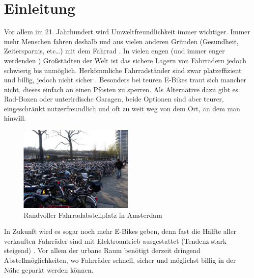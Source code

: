\section{Einleitung}
Vor allem im 21. Jahrhundert wird Umweltfreundlichkeit immer wichtiger. Immer mehr Menschen fahren deshalb und aus vielen anderen Gründen (Gesundheit, Zeitersparnis, etc…) mit dem Fahrrad . In vielen engen (und immer enger werdenden ) Großstädten der Welt ist das sichere Lagern von Fahrrädern jedoch schwierig bis unmöglich. Herkömmliche Fahrradständer sind zwar platzeffizient und billig, jedoch nicht sicher . Besonders bei teuren E-Bikes traut sich mancher nicht, dieses einfach an einen Pfosten zu sperren. Als Alternative dazu gibt es Rad-Boxen oder unterirdische Garagen, beide Optionen sind aber teurer, eingeschränkt nutzerfreundlich und oft zu weit weg von dem Ort, an dem man hinwill.

\begin{figure}[H]
    \centering
    \includegraphics[width=0.5\textwidth]{images/fahrrad_parkhaus_voll}
    \caption{Randvoller Fahrradabstellplatz in Amsterdam }
    \label{fig:fahrrad_parkhaus_voll}
\end{figure}

In Zukunft wird es sogar noch mehr E-Bikes geben, denn fast die Hälfte aller verkauften Fahrräder sind mit Elektroantrieb ausgestattet (Tendenz stark steigend) . Vor allem der urbane Raum benötigt derzeit dringend Abstellmöglichkeiten, wo Fahrräder schnell, sicher und möglichst billig in der Nähe geparkt werden können.






